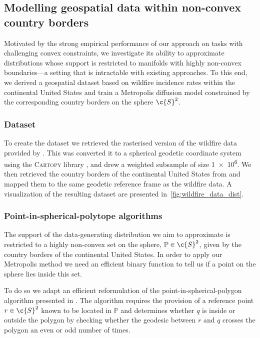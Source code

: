 \subsection{Modelling geospatial data within non-convex country borders}
\label{sec:exp_wildfires}

Motivated by the strong empirical performance of our approach on tasks with challenging convex constraints, we investigate its ability to approximate distributions whose support is restricted to manifolds with highly non-convex boundaries---a setting that is intractable with existing approaches.
To this end, we derived a geospatial dataset based on wildfire incidence rates within the continental United States and train a Metropolis diffusion model constrained by the corresponding country borders on the sphere \(\c{S}^2\).

\subsubsection{Dataset}
\label{sec:wildfire_data_dataset}
To create the dataset we retrieved the rasterised version of the wildfire data provided by \textcite{welty2020combined}.
This was converted it to a spherical geodetic coordinate system using the \textsc{Cartopy} library \parencite{Cartopy}, and drew a weighted subsample of size \num{1e6}.
We then retrieved the country borders of the continental United States from \textcite{natural_earth_data} and mapped them to the same geodetic reference frame as the wildfire data.
A visualization of the resulting dataset are presented in~\cref{fig:wildfire_data_dist}.

\subsubsection{Point-in-spherical-polytope algorithms}
\label{sec:wildfire_data_algo}

The support of the data-generating distribution we aim to approximate is restricted to a highly non-convex set on the sphere, \(\mathbb{P}\in\c{S}^2\), given by the country borders of the continental United States.
In order to apply our Metropolis method we need an efficient binary function to tell us if a point on the sphere lies inside this set.

To do so we adapt an efficient reformulation of the point-in-spherical-polygon algorithm \parencite{bevis1989locating} presented in \cite{ketzner2022robust}.
The algorithm requires the provision of a reference point \(r\in\c{S}^2\) known to be located in \(\mathbb{P}\) and determines whether \(q\) is inside or outside the polygon by checking whether the geodesic between \(r\) and \(q\) crosses the polygon an even or odd number of times.

